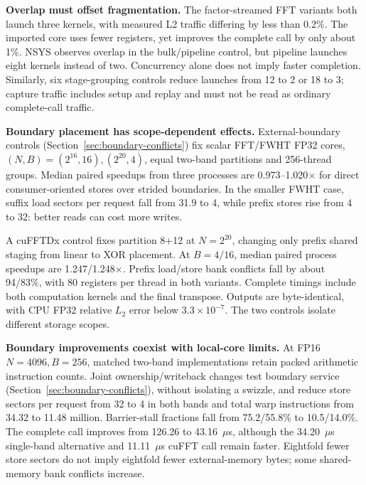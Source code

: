 \textbf{Overlap must offset fragmentation.}
The factor-streamed FFT variants both launch three kernels, with measured
L2 traffic differing by less than 0.2\%. The imported core uses fewer
registers, yet improves the complete call by only about 1\%.
NSYS observes overlap in the bulk/pipeline control, but pipeline launches
eight kernels instead of two. Concurrency alone does not imply faster completion. Similarly, six stage-grouping controls reduce launches
from 12 to 2 or 18 to 3; capture traffic includes setup and replay and must
not be read as ordinary complete-call traffic.

\textbf{Boundary placement has scope-dependent effects.}
\label{sec:boundary-io-control}
External-boundary controls (Section~\ref{sec:boundary-conflicts}) fix scalar
FFT/FWHT FP32 cores, $(N,B)=(2^{16},16),(2^{20},4)$, equal two-band partitions
and 256-thread groups. Median paired speedups from three processes are
0.973--1.020$\times$ for direct consumer-oriented stores over strided boundaries.
In the smaller FWHT case,
suffix load sectors per request fall from 31.9 to 4, while prefix stores
rise from 4 to 32: better reads can cost more writes.

A cuFFTDx control fixes partition 8+12 at $N=2^{20}$, changing only
prefix shared staging from linear to XOR placement.
At $B=4/16$, median paired process speedups are 1.247/1.248$\times$.
Prefix load/store bank conflicts fall by about 94/83\%, with 80 registers
per thread in both variants. Complete timings include both computation
kernels and the final transpose. Outputs are byte-identical, with CPU FP32
relative $L_2$ error below $3.3\times10^{-7}$. The two controls isolate
different storage scopes.

\textbf{Boundary improvements coexist with local-core limits.}
At FP16 $N=4096,B=256$, matched two-band implementations retain packed
arithmetic instruction counts. Joint ownership/writeback changes test boundary
service (Section~\ref{sec:boundary-conflicts}), without isolating a swizzle, and
reduce store
sectors per request from 32 to 4 in both bands and total warp instructions
from 34.32 to 11.48 million. Barrier-stall fractions fall from
75.2/55.8\% to 10.5/14.0\%. The complete call improves from 126.26 to
43.16~$\mu$s, although the 34.20~$\mu$s single-band alternative and
11.11~$\mu$s cuFFT call remain faster. Eightfold fewer store sectors do not
imply eightfold fewer external-memory bytes; some shared-memory bank conflicts
increase.

